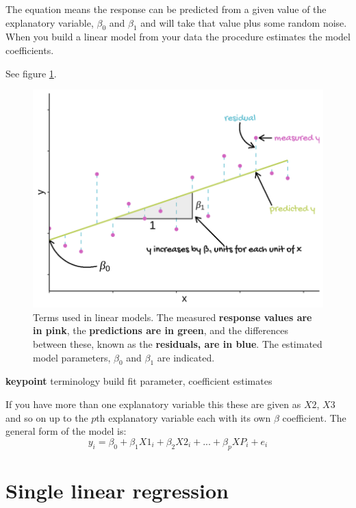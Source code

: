 \documentclass[
]{book}
\begin{document}
The equation means the response can be predicted from a given value of the explanatory variable, \(\beta_{0}\) and \(\beta_{1}\) and will take that value plus some random noise. When you build a linear model from your data the procedure estimates the model coefficients.

See figure \ref{fig:lm-annotated}.



\begin{figure}

\includegraphics[width=0.8\linewidth]{images/fig_4} \hfill{}

\caption{Terms used in linear models. The measured \textcolor[HTML]{d264c0}{\textbf{response values are in pink}}, the \textcolor[HTML]{c0d264}{\textbf{predictions are in green}}, and the differences between these, known as the \textcolor[HTML]{64c0d2}{\textbf{residuals, are in blue}}. The estimated model parameters, \(\beta_{0}\) and \(\beta_{1}\) are indicated.}\label{fig:lm-annotated}
\end{figure}

\textbf{keypoint}
terminology build fit
parameter, coefficient
estimates

If you have more than one explanatory variable this these are given as \(X2\), \(X3\) and so on up to the \(p\)th explanatory variable each with its own \(\beta\) coefficient. The general form of the model is:
\begin{equation}
y_{i}=\beta_{0}+\beta_{1}X1_{i}+\beta_{2}X2_{i}+...+\beta_{p}XP_{i}+e_{i}
\label{eq:regression}
\end{equation}

\hypertarget{single-linear-regression}{%
\chapter{Single linear regression}\label{single-linear-regression}}
\end{document}

